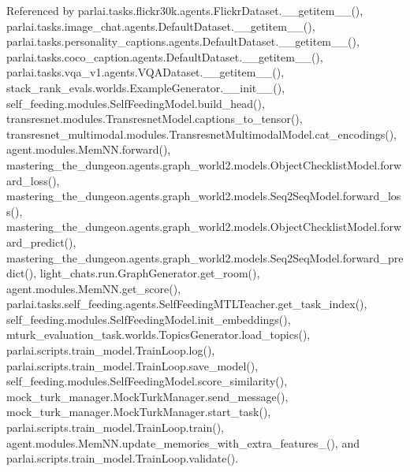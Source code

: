 Referenced by parlai.\+tasks.\+flickr30k.\+agents.\+Flickr\+Dataset.\+\_\+\+\_\+getitem\+\_\+\+\_\+(), parlai.\+tasks.\+image\+\_\+chat.\+agents.\+Default\+Dataset.\+\_\+\+\_\+getitem\+\_\+\+\_\+(), parlai.\+tasks.\+personality\+\_\+captions.\+agents.\+Default\+Dataset.\+\_\+\+\_\+getitem\+\_\+\+\_\+(), parlai.\+tasks.\+coco\+\_\+caption.\+agents.\+Default\+Dataset.\+\_\+\+\_\+getitem\+\_\+\+\_\+(), parlai.\+tasks.\+vqa\+\_\+v1.\+agents.\+V\+Q\+A\+Dataset.\+\_\+\+\_\+getitem\+\_\+\+\_\+(), stack\+\_\+rank\+\_\+evals.\+worlds.\+Example\+Generator.\+\_\+\+\_\+init\+\_\+\+\_\+(), self\+\_\+feeding.\+modules.\+Self\+Feeding\+Model.\+build\+\_\+head(), transresnet.\+modules.\+Transresnet\+Model.\+captions\+\_\+to\+\_\+tensor(), transresnet\+\_\+multimodal.\+modules.\+Transresnet\+Multimodal\+Model.\+cat\+\_\+encodings(), agent.\+modules.\+Mem\+N\+N.\+forward(), mastering\+\_\+the\+\_\+dungeon.\+agents.\+graph\+\_\+world2.\+models.\+Object\+Checklist\+Model.\+forward\+\_\+loss(), mastering\+\_\+the\+\_\+dungeon.\+agents.\+graph\+\_\+world2.\+models.\+Seq2\+Seq\+Model.\+forward\+\_\+loss(), mastering\+\_\+the\+\_\+dungeon.\+agents.\+graph\+\_\+world2.\+models.\+Object\+Checklist\+Model.\+forward\+\_\+predict(), mastering\+\_\+the\+\_\+dungeon.\+agents.\+graph\+\_\+world2.\+models.\+Seq2\+Seq\+Model.\+forward\+\_\+predict(), light\+\_\+chats.\+run.\+Graph\+Generator.\+get\+\_\+room(), agent.\+modules.\+Mem\+N\+N.\+get\+\_\+score(), parlai.\+tasks.\+self\+\_\+feeding.\+agents.\+Self\+Feeding\+M\+T\+L\+Teacher.\+get\+\_\+task\+\_\+index(), self\+\_\+feeding.\+modules.\+Self\+Feeding\+Model.\+init\+\_\+embeddings(), mturk\+\_\+evaluation\+\_\+task.\+worlds.\+Topics\+Generator.\+load\+\_\+topics(), parlai.\+scripts.\+train\+\_\+model.\+Train\+Loop.\+log(), parlai.\+scripts.\+train\+\_\+model.\+Train\+Loop.\+save\+\_\+model(), self\+\_\+feeding.\+modules.\+Self\+Feeding\+Model.\+score\+\_\+similarity(), mock\+\_\+turk\+\_\+manager.\+Mock\+Turk\+Manager.\+send\+\_\+message(), mock\+\_\+turk\+\_\+manager.\+Mock\+Turk\+Manager.\+start\+\_\+task(), parlai.\+scripts.\+train\+\_\+model.\+Train\+Loop.\+train(), agent.\+modules.\+Mem\+N\+N.\+update\+\_\+memories\+\_\+with\+\_\+extra\+\_\+features\+\_\+(), and parlai.\+scripts.\+train\+\_\+model.\+Train\+Loop.\+validate().

\mbox{\label{classimage__chat__collection_1_1worlds_1_1ExampleGenerator_a1567fe5f2514d3ca587135876f662c91}} 
